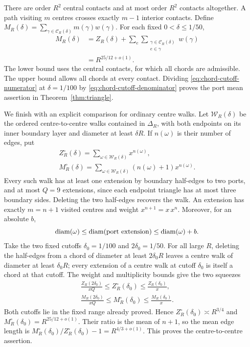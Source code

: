 There are order $R^2$ central contacts and at most order $R^2$
contacts altogether. A path visiting $m$ centres crosses exactly
$m-1$ interior contacts. Define
$M_R(\delta)=\sum_{\gamma\in\mathcal C_R(\delta)}m(\gamma)w(\gamma)$.
For each fixed $0<\delta\le1/50$,
\begin{equation}\label{eq:chord-cutoff-numerator}
 \begin{split}
 M_R(\delta)
 &=Z_R(\delta)+
   \sum_e\sum_{\substack{\gamma\in\mathcal C_R(\delta)\\e\in\gamma}}
        w(\gamma)\\
 &=R^{25/12+o(1)}.
 \end{split}
\end{equation}
The lower bound uses the central contacts, for which all chords are
admissible. The upper bound allows all chords at every contact.
Dividing \eqref{eq:chord-cutoff-numerator} at $\delta=1/100$ by
\eqref{eq:chord-cutoff-denominator} proves the port mean assertion in
Theorem~\ref{thm:triangle}.

We finish with an explicit comparison for ordinary centre walks.
Let $\mathcal W_R(\delta)$ be the ordered centre-to-centre walks
contained in $\Delta_R$, with both endpoints on its inner boundary
layer and diameter at least $\delta R$. If $n(\omega)$ is their number
of edges, put
\[
 \begin{gathered}
 Z_R^\circ(\delta)=\sum_{\omega\in\mathcal W_R(\delta)}x^{n(\omega)},\\
 M_R^\circ(\delta)=
       \sum_{\omega\in\mathcal W_R(\delta)}(n(\omega)+1)x^{n(\omega)}.
 \end{gathered}
\]
Every such walk has at least one extension by boundary half-edges to
two ports, and at most $Q=9$ extensions, since each endpoint triangle
has at most three boundary sides. Deleting the two half-edges recovers
the walk. An extension has exactly $m=n+1$ visited centres and weight
$x^{n+1}=x\,x^n$. Moreover, for an absolute $b$,
\[
 \operatorname{diam}(\omega)\le\operatorname{diam}(\text{port extension})
                 \le\operatorname{diam}(\omega)+b.
\]
Take the two fixed cutoffs $\delta_0=1/100$ and $2\delta_0=1/50$.
For all large $R$, deleting the half-edges from a chord of diameter
at least $2\delta_0R$ leaves a centre walk of diameter at least
$\delta_0R$; every extension of a centre walk at cutoff $\delta_0$
is itself a chord at that cutoff. The weight and multiplicity bounds
give the two squeezes
\begin{equation}\label{eq:centre-cutoff-squeeze}
 \begin{gathered}
 \frac{Z_R(2\delta_0)}{xQ}\le Z_R^\circ(\delta_0)
       \le\frac{Z_R(\delta_0)}x,\\
 \frac{M_R(2\delta_0)}{xQ}\le M_R^\circ(\delta_0)
       \le\frac{M_R(\delta_0)}x.
 \end{gathered}
\end{equation}
Both cutoffs lie in the fixed range already proved. Hence
$Z_R^\circ(\delta_0)\asymp R^{3/4}$ and
$M_R^\circ(\delta_0)=R^{25/12+o(1)}$. Their ratio is the mean of
$n+1$, so the mean edge length is
$M_R^\circ(\delta_0)/Z_R^\circ(\delta_0)-1=R^{4/3+o(1)}$.
This proves the centre-to-centre assertion.
